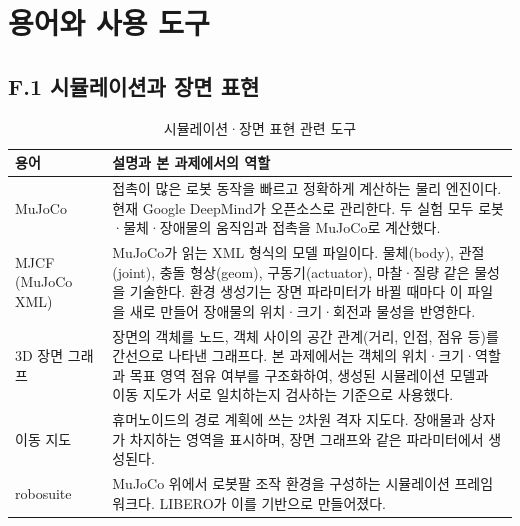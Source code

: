 \section{용어와 사용 도구}
\subsection*{F.1 시뮬레이션과 장면 표현}
\begin{table}[H]
\centering\small
\caption{시뮬레이션·장면 표현 관련 도구}
\begin{tabularx}{\linewidth}{@{}p{30mm}Y@{}}
\toprule
용어 & 설명과 본 과제에서의 역할 \\
\midrule
MuJoCo~\cite{mujoco} & 접촉이 많은 로봇 동작을 빠르고 정확하게 계산하는 물리 엔진이다. 현재 Google DeepMind가 오픈소스로 관리한다. 두 실험 모두 로봇·물체·장애물의 움직임과 접촉을 MuJoCo로 계산했다. \\
MJCF (MuJoCo XML)~\cite{mjcf} & MuJoCo가 읽는 XML 형식의 모델 파일이다. 물체(body), 관절(joint), 충돌 형상(geom), 구동기(actuator), 마찰·질량 같은 물성을 기술한다. 환경 생성기는 장면 파라미터가 바뀔 때마다 이 파일을 새로 만들어 장애물의 위치·크기·회전과 물성을 반영한다. \\
3D 장면 그래프~\cite{sg} & 장면의 객체를 노드, 객체 사이의 공간 관계(거리, 인접, 점유 등)를 간선으로 나타낸 그래프다. 본 과제에서는 객체의 위치·크기·역할과 목표 영역 점유 여부를 구조화하여, 생성된 시뮬레이션 모델과 이동 지도가 서로 일치하는지 검사하는 기준으로 사용했다. \\
이동 지도 & 휴머노이드의 경로 계획에 쓰는 2차원 격자 지도다. 장애물과 상자가 차지하는 영역을 표시하며, 장면 그래프와 같은 파라미터에서 생성된다. \\
robosuite~\cite{robosuite} & MuJoCo 위에서 로봇팔 조작 환경을 구성하는 시뮬레이션 프레임워크다. LIBERO가 이를 기반으로 만들어졌다. \\
\bottomrule
\end{tabularx}
\end{table}


